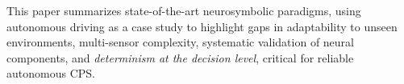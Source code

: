 
This paper summarizes state-of-the-art neurosymbolic paradigms, using autonomous driving as a case study to highlight gaps in adaptability to unseen environments, multi-sensor complexity, systematic validation of neural components, and \textit{determinism at the decision level}, critical for reliable autonomous CPS.

